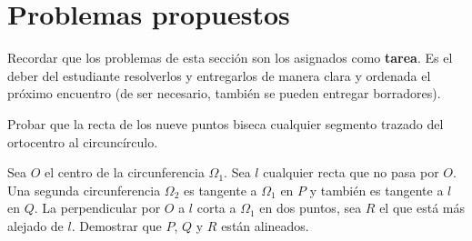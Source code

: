 \section{Problemas propuestos}

Recordar que los problemas de esta sección son los asignados como \textbf{tarea}.
Es el deber del estudiante resolverlos y entregarlos de manera clara y ordenada el próximo encuentro
(de ser necesario, también se pueden entregar borradores).

\begin{section-exercise}
    Probar que la recta de los nueve puntos biseca cualquier segmento trazado del ortocentro al circuncírculo.
\end{section-exercise}

\begin{section-problem}
    Sea $O$ el centro de la circunferencia $\Omega_1$.
    Sea $l$ cualquier recta que no pasa por $O$.
    Una segunda circunferencia $\Omega_2$ es tangente a $\Omega_1$ en $P$ y también es tangente a $l$ en $Q$.
    La perpendicular por $O$ a $l$ corta a $\Omega_1$ en dos puntos, sea $R$ el que está más alejado de $l$.
    Demostrar que $P$, $Q$ y $R$ están alineados.
\end{section-problem}